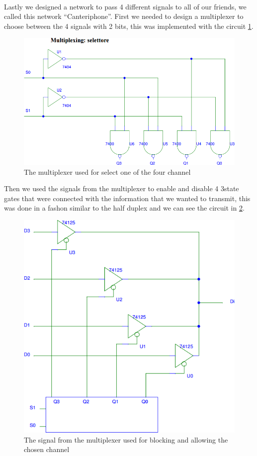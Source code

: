 \\
Lastly we designed a network to pass 4 different signals to all of our friends, we called this network  ``Canteriphone''. First we needed to design a multiplexer to choose between the 4 signals with 2 bits, this was implemented with the circuit \ref{multi_select}.
\begin{figure}[H]
\centering
\includegraphics[width=.7\textwidth]{10/multi_select.png}
\caption{The multiplexer used for select one of the four channel}\label{multi_select}
\end{figure}

Then we used the signals from the multiplexer to enable and disable 4 3state gates that were connected with the information that we wanted to transmit, this was done in a fashon similar to the half duplex and we can see the circuit in \ref{multi_wired}.
\begin{figure}[H]
\centering
\includegraphics[width=.7\textwidth]{10/multi_wired.png}
\caption{The signal from the multiplexer used for blocking and allowing the chosen channel}\label{multi_wired}
\end{figure}

